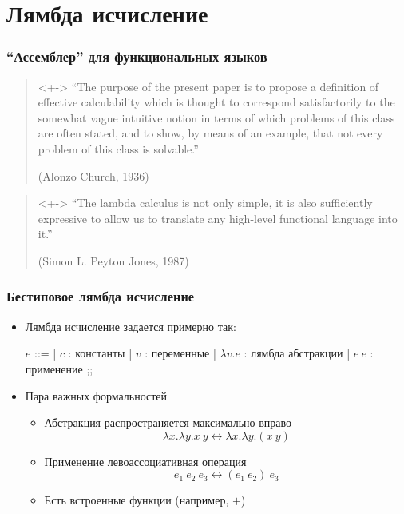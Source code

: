 \section{Лямбда исчисление}
\begin{frame}
    \frametitle{\enquote{Ассемблер} для функциональных языков}

    \begin{quotation}<+->
        \enquote{The purpose of the present paper is to propose a definition of effective calculability which is thought to correspond satisfactorily to the somewhat vague intuitive notion in terms of which problems of this class are often stated, and to show, by means of an example, that not every problem of this class is solvable.}

        \raggedleft
        (Alonzo Church, 1936)
    \end{quotation}

    \begin{quotation}<+->
        \enquote{The lambda calculus is not only simple, it is also sufficiently expressive to allow us to translate any high-level functional language into it.}

        \raggedleft
        (Simon L. Peyton Jones, 1987)
    \end{quotation}

\end{frame}

\begin{frame}
    \frametitle{Бестиповое лямбда исчисление}

    \begin{itemize}
        \item Лямбда исчисление задается примерно так:
              \begin{center}
                  \begin{bnf}
                      $e$ ::=
                      | $c$ : константы
                      | $v$ : переменные
                      | $\lambda v.e$ : лямбда абстракции
                      | $e\ e$ : применение
                      ;;
                  \end{bnf}
              \end{center}
        \item Пара важных формальностей
              \begin{itemize}
                  \item Абстракция распространяется максимально вправо
                        \[\lambda x. \lambda y. x\ y \leftrightarrow \lambda x. \lambda y. (x\ y)\]
                  \item Применение левоассоциативная операция
                        \[e_1\ e_2\ e_3 \leftrightarrow (e_1\ e_2)\ e_3\]
                  \item Есть встроенные функции (например, $+$)
              \end{itemize}
    \end{itemize}
\end{frame}

